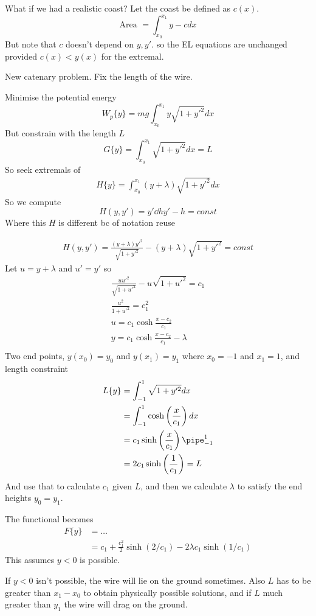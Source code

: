 \documentclass{E:/Documents/Latex/myassignment}
\begin{document}
What if we had a realistic coast?
Let the coast be defined as $c(x)$.
\[\text{Area } = \int_{x_0}^{x_1} y - c dx\]
But note that $c$ doesn't depend on $y,y'$. so the EL equations are unchanged provided $c(x) < y(x)$ for the extremal.


New catenary problem. Fix the length of the wire.

Minimise the potential energy
\[W_p\{y\} = mg \int_{x_0}^{x_1} y\sqrt{1+y'^2} dx\]
But constrain with the length $L$
\[G\{y\} = \int_{x_0}^{x_1} \sqrt{1+y'^2} dx = L\]
So seek extremals of
\begin{align*}
	H\{y\} = \int_{x_0}^{x_1} (y+\lambda) \sqrt{1+y'^2} dx
\end{align*}
So we compute
\[H(y,y') = y' \dd h{y'} - h = const\]
Where this $H$ is different bc of notation reuse

\begin{align*}
	H(y,y') = \frac{(y+\lambda) y'^2}{\sqrt{1+y'^2}} - (y+\lambda)\sqrt{1+y'^2} = const
\end{align*}
Let $ u = y+\lambda$ and $u' = y'$ so
\begin{align*}
	\frac{uu'^2}{\sqrt{1+u'^2}} - u\sqrt{1+u'^2} = c_1\\
	\frac{u^2}{1+u'^2} = c_1^2\\
	u = c_1 \cosh \frac{x-c_2}{c_1}\\
	y = c_1 \cosh \frac{x-c_2}{c_1} - \lambda\\
\end{align*}
Two end points, $y(x_0) = y_0$ and $y(x_1) = y_1$ where $x_0 = -1$ and $x_1 = 1$, and length constraint
\begin{align*}
	L\{y\} &= \int_{-1}^1 \sqrt{1+y'^2} dx\\
	&= \int_{-1}^1 \cosh \left(\frac{x}{c_1}\right) dx\\
	&= c_1 \sinh \left(\frac{x}{c_1}\right)\pipe_{-1}^1\\
	&= 2c_1 \sinh\left(\frac{1}{c_1}\right) = L
\end{align*}
And use that to calculate $c_1$ given $L$, and then we calculate $\lambda$ to satisfy the end heights $y_0=y_1$.

The functional becomes
\begin{align*}
	F\{y\} &= \ldots\\
	&=c_1 + \frac{c_1^2}{2} \sinh(2/c_1) - 2 \lambda c_1 \sinh(1/c_1)
\end{align*}
This assumes $y<0$ is possible.



If $y<0$ isn't possible, the wire will lie on the ground sometimes. 
Also $L$ has to be greater than $x_1 - x_0$ to obtain physically possible solutions, and if $L$ much greater than $y_1$ the wire will drag on the ground. 
\end{document}
